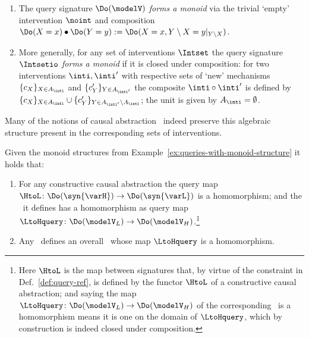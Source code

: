 \documentclass{article}
\begin{document}
{\begin{examples}
\begin{enumerate}[label=(\arabic*)]
\item \label{itm:mon-of-concrete-Do}
The query signature $\Do(\modelV)$ \emph{forms a monoid} via the trivial `empty' intervention $\noint$ 
and composition $\Do(X =x) \bullet \Do(Y=y) := \Do(X = x, {Y \setminus X} = y|_{Y \setminus X} )$. 

\item \label{itm:mon-of-gen-int}
More generally, for any set of interventions $\Intset$ the query signature $\Intsetio$  \emph{forms a monoid} if it is closed under composition: 
for two interventions $\inti,\inti'$  with respective sets of `new' mechanisms $\{c_{X}\}_{X \in A_{\inti}}$ and $\{c_{Y}'\}_{Y \in A_{\inti'}}$  
the composite $\inti \circ \inti'$ is defined by $\{c_{X}\}_{X \in A_{\inti}} \cup \{c_{Y}'\}_{Y \in A_{\inti'}\setminus A_{\inti}}$; the unit is given by $A_{\inti} = \emptyset$. 
\end{enumerate}
\end{examples}

Many of the notions of causal abstraction \ indeed preserve this algebraic structure present in the corresponding sets of interventions.  

\begin{proposition}	\label{prop:CA-notions-with-hom} 
Given the monoid structures from Example~\ref{ex:queries-with-monoid-structure} it holds that:
\begin{enumerate}[label=(\alph*)]
	\item \label{itm:CCA-gives-hom}
	For any constructive causal abstraction the query map $\HtoL \colon \Do(\syn{\varH}) \to \Do(\syn{\varL})$ is a homomorphism;  
		and the \qup\ it defines  
		has a homomorphism as query map $\LtoHquery \colon \Do(\modelV_L) \to \Do(\modelV_H)$.\footnote{Here $\HtoL$ is the map between signatures that, by virtue of the constraint in Def.~\ref{def:query-ref}, is defined by the functor $\HtoL$ of a constructive causal abstraction; and saying the map $\LtoHquery \colon \Do(\modelV_L) \to \Do(\modelV_H)$ of the corresponding \qup\ is a homomorphism means it is one on the domain of $\LtoHquery$, which by construction is indeed closed under composition.}  
	\item \label{itm:iso-CCA-gives-hom} 
	Any \isoCCA\ defines an overall \qup\  whose map $\LtoHquery$ is a homomorphism. 
\end{enumerate}
\end{proposition}

}
\end{document}

